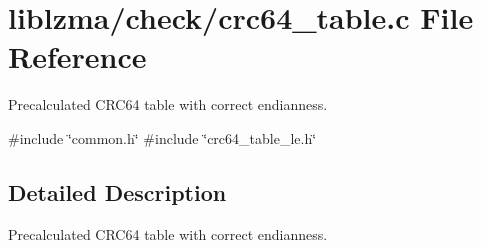 \section{liblzma/check/crc64\+\_\+table.c File Reference}
\label{crc64__table_8c}


Precalculated C\+R\+C64 table with correct endianness.  


{\ttfamily \#include \char`\"{}common.\+h\char`\"{}}\newline
{\ttfamily \#include \char`\"{}crc64\+\_\+table\+\_\+le.\+h\char`\"{}}\newline


\subsection{Detailed Description}
Precalculated C\+R\+C64 table with correct endianness. 

